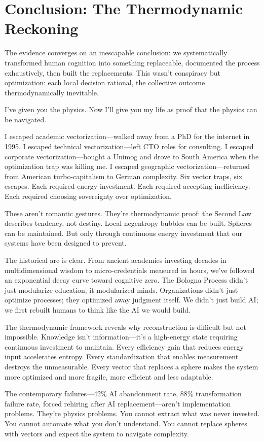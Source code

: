 \section{Conclusion: The Thermodynamic Reckoning}

The evidence converges on an inescapable conclusion: we systematically transformed human cognition into something replaceable, documented the process exhaustively, then built the replacements. This wasn't conspiracy but optimization: each local decision rational, the collective outcome thermodynamically inevitable.

I've given you the physics. Now I'll give you my life as proof that the physics can be navigated.

I escaped academic vectorization—walked away from a PhD for the internet in 1995. I escaped technical vectorization—left CTO roles for consulting. I escaped corporate vectorization—bought a Unimog and drove to South America when the optimization trap was killing me. I escaped geographic vectorization—returned from American turbo-capitalism to German complexity. Six vector traps, six escapes. Each required energy investment. Each required accepting inefficiency. Each required choosing sovereignty over optimization.

These aren't romantic gestures. They're thermodynamic proof: the Second Law describes tendency, not destiny. Local negentropy bubbles can be built. Spheres can be maintained. But only through continuous energy investment that our systems have been designed to prevent.

The historical arc is clear. From ancient academies investing decades in multidimensional wisdom to micro-credentials measured in hours, we've followed an exponential decay curve toward cognitive zero. The Bologna Process didn't just modularize education; it modularized minds. Organizations didn't just optimize processes; they optimized away judgment itself. We didn't just build AI; we first rebuilt humans to think like the AI we would build.

The thermodynamic framework reveals why reconstruction is difficult but not impossible. Knowledge isn't information—it's a high-energy state requiring continuous investment to maintain. Every efficiency gain that reduces energy input accelerates entropy. Every standardization that enables measurement destroys the unmeasurable. Every vector that replaces a sphere makes the system more optimized and more fragile, more efficient and less adaptable.

The contemporary failures—42\% AI abandonment rate, 88\% transformation failure rate, forced rehiring after AI replacement—aren't implementation problems. They're physics problems. You cannot extract what was never invested. You cannot automate what you don't understand. You cannot replace spheres with vectors and expect the system to navigate complexity.


